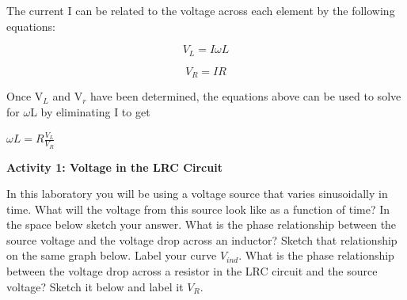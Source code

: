 The current I can be related to the voltage across each element by
the following equations:

\[
V_{L}=I\omega L\]


\[
V_{R}=IR\]




Once V\( _{L} \) and V\( _{r} \) have been determined, the equations
above can be used to solve for \( \omega  \)L by eliminating
I to get 

{\centering \( \omega L=R\frac{V_{L}}{V_{R}} \) \par}


\vspace{0.3cm}
{\centering {} \par}
\vspace{0.3cm}

\textbf{Activity 1: Voltage in the LRC Circuit }

In this laboratory you will be using a voltage source that varies
sinusoidally in time.
What will the voltage from this source look like as a function
of time?
In the space below sketch your answer.
What is the phase relationship between the source voltage and the
voltage drop across an inductor?
Sketch that relationship on the same graph below.
Label your curve $V_{ind}$.
What is the phase relationship between the voltage drop
across a resistor in the LRC circuit and the source voltage?
Sketch it below and label it $V_R$.

\vspace{0.3cm}
{\centering {} \par}
\vspace{0.3cm}

